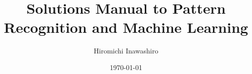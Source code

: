 \documentclass[12pt]{article}
\title{Solutions Manual to Pattern Recognition and Machine Learning}
\author{Hiromichi Inawashiro}
\date{\today}
\numberwithin{equation}{section}
\begin{document}
\maketitle{}

\newpage{}


\end{document}
